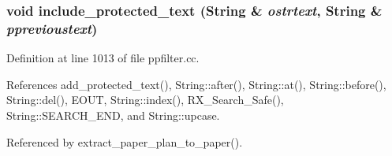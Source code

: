 \subsubsection{\setlength{\rightskip}{0pt plus 5cm}void include\_\-protected\_\-text ({\bf String} \& {\em ostrtext}, {\bf String} \& {\em pprevioustext})}\label{ppfilter_8cc_a27}




Definition at line 1013 of file ppfilter.cc.

References add\_\-protected\_\-text(), String::after(), String::at(), String::before(), String::del(), EOUT, String::index(), RX\_\-Search\_\-Safe(), String::SEARCH\_\-END, and String::upcase.

Referenced by extract\_\-paper\_\-plan\_\-to\_\-paper().



